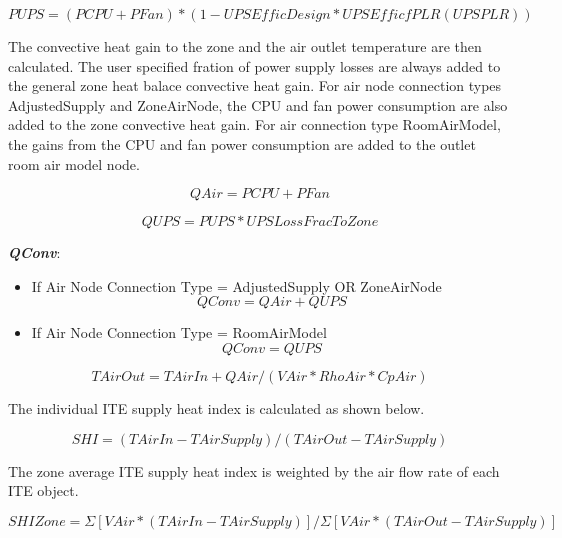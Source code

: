 \begin{equation}
PUPS = (PCPU + PFan) * (1 - UPSEfficDesign * UPSEfficfPLR (UPSPLR))
\end{equation}

The convective heat gain to the zone and the air outlet temperature are then calculated. The user specified fration of power supply losses are always added to the general zone heat balace convective heat gain. For air node connection types AdjustedSupply and ZoneAirNode, the CPU and fan power consumption are also added to the zone convective heat gain. For air connection type RoomAirModel, the gains from the CPU and fan power consumption are added to the outlet room air model node.

\begin{equation}
QAir = PCPU + PFan
\end{equation}

\begin{equation}
QUPS = PUPS * UPSLossFracToZone
\end{equation}

\emph{\textbf{QConv}}:

\begin{itemize}
    \tightlist
  \item
    If Air Node Connection Type = AdjustedSupply OR ZoneAirNode
\begin{equation}
QConv = QAir + QUPS
\end{equation}
  \item
    If Air Node Connection Type = RoomAirModel
\begin{equation}
QConv = QUPS
\end{equation}
\end{itemize}

\begin{equation}
TAirOut = TAirIn + QAir / (VAir * RhoAir * CpAir)
\end{equation}

The individual ITE supply heat index is calculated as shown below.

\begin{equation}
SHI = (TAirIn - TAirSupply) / (TAirOut - TAirSupply)
\end{equation}

The zone average ITE supply heat index is weighted by the air flow rate of each ITE object.

\begin{equation}
SHIZone = \Sigma [VAir * (TAirIn - TAirSupply)] / \Sigma [VAir * (TAirOut - TAirSupply)]
\end{equation}

